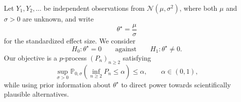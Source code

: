 Let \(Y_1,Y_2,\ldots\) be independent observations from
\(\mathcal N(\mu,\sigma^2)\), where both \(\mu\) and \(\sigma>0\) are
unknown, and write
\[
  \theta^\star=\frac{\mu}{\sigma}
\]
for the standardized effect size. We consider
\[
  H_0:\theta^\star=0
  \qquad\text{against}\qquad
  H_1:\theta^\star\neq0.
\]
Our objective is a \(p\)-process \((P_n)_{n\geq2}\) satisfying
\[
  \sup_{\sigma>0}
  \mathbb P_{0,\sigma}
  \left(\inf_{n\geq2}P_n\leq\alpha\right)
  \leq\alpha,
  \qquad \alpha\in(0,1),
\]
while using prior information about \(\theta^\star\) to direct power
towards scientifically plausible alternatives.

%
%



